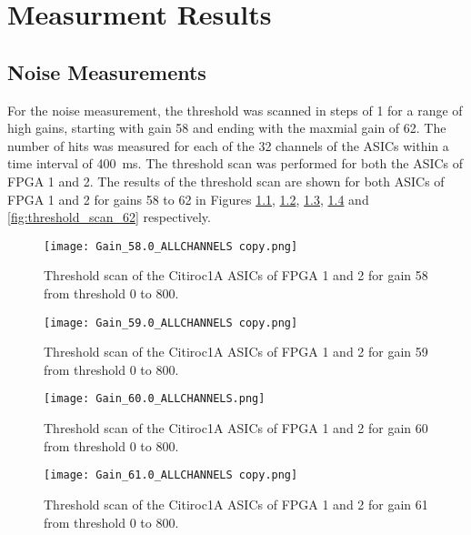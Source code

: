 \chapter{Measurment Results}\label{cha:results}
\noindent
\section{Noise Measurements}
For the noise measurement, the threshold was scanned in steps of 1 for a range of high gains,
starting with gain 58 and ending with the maxmial gain of 62.
\newline
The number of hits was measured for each of the 32 channels of the ASICs within a time interval of \SI{400}{\milli\second}.
The threshold scan was performed for both the ASICs of FPGA 1 and 2.
\newline
The results of the threshold scan are shown for both ASICs of FPGA 1 and 2 for gains 58 to 62 in Figures \ref{fig:threshold_scan_58}, \ref{fig:threshold_scan_59}, \ref{fig:threshold_scan_60}, \ref{fig:threshold_scan_61} and \ref{fig:threshold_scan_62} respectively.

    \begin{figure}[H]
        \centering
        \texttt{[image: Gain\_58.0\_ALLCHANNELS copy.png]}
        \caption{Threshold scan of the Citiroc1A ASICs of FPGA 1 and 2 for gain 58 from threshold 0 to 800.}
        \label{fig:threshold_scan_58}
    \end{figure}
    
    \begin{figure}[H]
        \centering
        \texttt{[image: Gain\_59.0\_ALLCHANNELS copy.png]}
        \caption{Threshold scan of the Citiroc1A ASICs of FPGA 1 and 2 for gain 59 from threshold 0 to 800.}
        \label{fig:threshold_scan_59}
    \end{figure}
    
    \begin{figure}[H]
        \centering
        \texttt{[image: Gain\_60.0\_ALLCHANNELS.png]}
        \caption{Threshold scan of the Citiroc1A ASICs of FPGA 1 and 2 for gain 60 from threshold 0 to 800.}
        \label{fig:threshold_scan_60}
    \end{figure}
    
    \begin{figure}[H]
        \centering
        \texttt{[image: Gain\_61.0\_ALLCHANNELS copy.png]}
        \caption{Threshold scan of the Citiroc1A ASICs of FPGA 1 and 2 for gain 61 from threshold 0 to 800.}
        \label{fig:threshold_scan_61}
    \end{figure}
    
